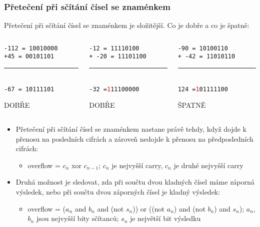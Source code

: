 \documentclass{beamer}
\begin{document}
\begin{frame}
\frametitle{Přetečení při sčítání čísel se znaménkem}

Přetečení při sčítání čísel se znaménkem je složitější. Co je dobře a co je špatně:
\bigskip
\begin{columns}
\begin{column}{0.3\textwidth}
\texttt{-112 = 10010000}\\
\texttt{+\phantom{x}45 = 00101101}\\
\vspace{-8pt}
\rule[0pt]{3cm}{0.1pt}\\
\texttt{\phantom{x}-67 = 10111101}\\
\begin{center}
\large DOBŘE
\end{center}
\end{column}
\hfill
\begin{column}{0.3\textwidth}
\texttt{\phantom{xx}-12 = 11110100}\\
\texttt{+ -20 = 11101100}\\
\vspace{-8pt}
\rule[0pt]{3cm}{0.1pt}\\
\texttt{\phantom{xx}-32 =\textcolor{red}{1}11100000}\\
\begin{center}
\large DOBŘE
\end{center}
\end{column}
\hfill
\begin{column}{0.3\textwidth}
\texttt{\phantom{xx}-90 = 10100110}\\
\texttt{+ -42 = 11010110}\\
\vspace{-8pt}
\rule[0pt]{3cm}{0.1pt}\\
\texttt{\phantom{xx}124 =\textcolor{red}{1}01111100}\\
\begin{center}
\large ŠPATNĚ
\end{center}
\end{column}
\end{columns}
\bigskip
\begin{itemize}
\item Přetečení při sčítání čísel se znaménkem nastane právě tehdy, když dojde k přenosu na posledních cifrách a zároveň nedojde k přenosu na předposledních cifrách:
\begin{itemize}
\item overflow = $c_n$ xor $c_{n-1}$; $c_n$ je nejvyšší carry, $c_n$ je druhé nejvyšší carry
\end{itemize}
\item Druhá možnost je sledovat, zda při součtu dvou kladných čísel máme záporná výsledek, nebo při součtu dvou záporných čísel je kladný výsledek:
\begin{itemize}
\item overflow = ($a_n$ and  $b_n$ and (not $s_n$)) or ((not $a_n$) and  (not $b_n$) and $s_n$); $a_n$, $b_n$ jsou nejvyšší bity sčítanců; $s_n$ je největší bit výsledku
\end{itemize}
\end{itemize}
\end{frame}
\end{document}
